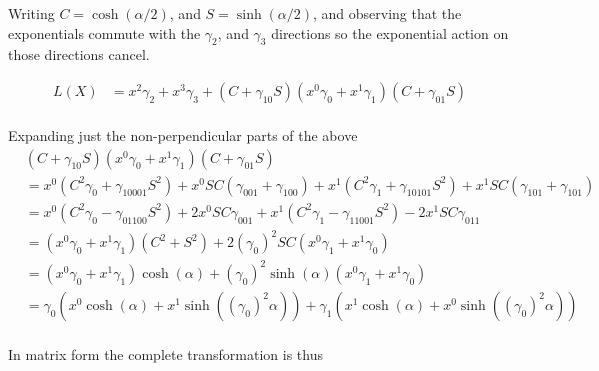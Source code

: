 \documentclass{article}
\begin{document}
Writing $C = \cosh(\alpha/2)$, and $S = \sinh(\alpha/2)$, and observing that the exponentials commute with the $\gamma_2$, and $\gamma_3$ directions so the exponential
action on those directions cancel.

\begin{align*}
L(X)
&= x^2 \gamma_2 + x^3 \gamma_3 + (C + \gamma_{10} S) ( x^0 \gamma_0 + x^1 \gamma_1 ) (C + \gamma_{01} S) \\
\end{align*}

Expanding just the non-perpendicular parts of the above
\begin{align*}
&(C + \gamma_{10} S) ( x^0 \gamma_0 + x^1 \gamma_1 ) (C + \gamma_{01} S) \\
&=
x^0 (C^2 \gamma_0 + \gamma_{10001} S^2) + x^0 S C (\gamma_{001} + \gamma_{100})
+x^1 (C^2 \gamma_1 + \gamma_{10101} S^2) + x^1 S C (\gamma_{101} + \gamma_{101}) \\
&=
x^0 (C^2 \gamma_0 - \gamma_{01100} S^2) + 2 x^0 S C \gamma_{001} 
+x^1 (C^2 \gamma_1 - \gamma_{11001} S^2) - 2 x^1 S C \gamma_{011} \\
&= (x^0 \gamma_0 + x^1 \gamma_1) (C^2 + S^2) + 2 (\gamma_0)^2 S C (x^0 \gamma_{1} + x^1 \gamma_{0}) \\
&= (x^0 \gamma_0 + x^1 \gamma_1) \cosh(\alpha) + (\gamma_0)^2 \sinh(\alpha) (x^0 \gamma_{1} + x^1 \gamma_{0}) \\
&= 
\gamma_0 ( x^0 \cosh(\alpha) + x^1 \sinh((\gamma_0)^2 \alpha) )
+\gamma_1 ( x^1 \cosh(\alpha) + x^0 \sinh((\gamma_0)^2 \alpha) ) \\
\end{align*}


In matrix form the complete transformation is thus
\end{document}
